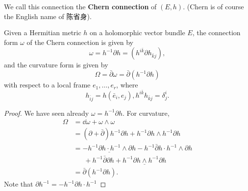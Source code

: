 \documentclass[12pt]{article}
\begin{document}
\begin{definition}
  We call this connection the \textbf{Chern connection} of \((E,h)\). (Chern is of
  course the English name of {陈省身}).
\end{definition}

\begin{theorem}
  Given a Hermitian metric \(h\) on a holomorphic vector bundle \(E\), the connection
  form \(\omega\) of the Chern connection is given by \[
    \omega=h^{-1}\partial h=\left(h^{i\bar{k}}\partial h_{\bar{k}j}\right)
  ,\] and the curvature form is given by \[
    \boxed{\Omega=\bar{\partial}\omega=\bar{\partial}(h^{-1}\partial h)}
  \] with respect to a local frame \(e_1,\ldots,e_r\), where \[
    h_{\bar{i}j}=h(\bar{e}_i,e_j),h^{i\bar{k}}h_{\bar{k}j}=\delta^i_j
  .\] 
\end{theorem}
\begin{proof}
  We have seen already \(\omega=h^{-1}\partial h\). For curvature,
  \begin{align*}
    \Omega&=\dd{\omega}+\omega\wedge \omega \\ 
    &=(\partial+\bar{\partial})h^{-1}\partial h
    +h^{-1}\partial h\wedge h^{-1}\partial h \\
    &=\underline{-h^{-1}\partial h\cdot h^{-1}\wedge \partial h}
    -h^{-1}\bar{\partial}h\cdot h^{-1}\wedge \partial h \\
    &\phantom{=\ } +h^{-1}\bar{\partial}\partial h
    +\underline{h^{-1}\partial h\wedge h^{-1}\partial h} \\
    &=\bar{\partial}(h^{-1}\partial h)
  .\end{align*}
  Note that \(\partial h^{-1}=-h^{-1}\partial h\cdot h^{-1}\)
\end{proof}
\end{document}
